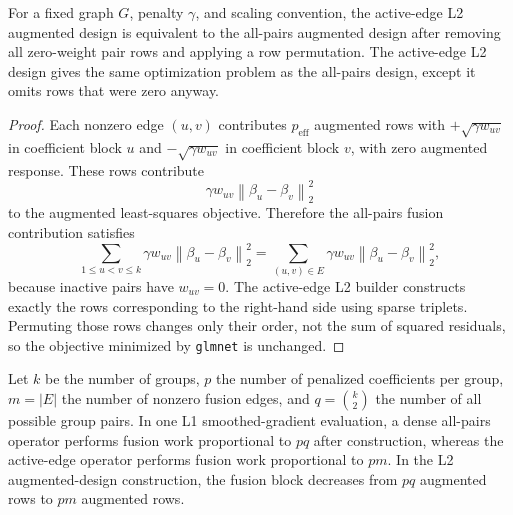 \documentclass[twoside,11pt]{article}
\newcommand{\norm}[1]{\left\lVert #1 \right\rVert}
\begin{document}
\begin{proposition}
\label{prop:l2-equivalence}
For a fixed graph $G$, penalty $\gamma$, and scaling convention, the active-edge L2 augmented design is equivalent to the all-pairs augmented design after removing all zero-weight pair rows and applying a row permutation.
The active-edge L2 design gives the same optimization problem as the all-pairs design, except it omits rows that were zero anyway.
\end{proposition}

\begin{proof}
Each nonzero edge $(u,v)$ contributes $p_{\mathrm{eff}}$ augmented rows with $+\sqrt{\gamma w_{uv}}$ in coefficient block $u$ and $-\sqrt{\gamma w_{uv}}$ in coefficient block $v$, with zero augmented response. 
These rows contribute
\[
  \gamma w_{uv}\norm{\beta_u-\beta_v}_2^2
\]
to the augmented least-squares objective. 
Therefore the all-pairs fusion contribution satisfies
\[
  \sum_{1\leq u<v\leq k}
  \gamma w_{uv}\norm{\beta_u-\beta_v}_2^2
  =
  \sum_{(u,v)\in E}
  \gamma w_{uv}\norm{\beta_u-\beta_v}_2^2,
\]
because inactive pairs have $w_{uv}=0$. 
The active-edge L2 builder constructs exactly the rows corresponding to the right-hand side using sparse triplets.
Permuting those rows changes only their order, not the sum of squared residuals, so the objective minimized by \texttt{glmnet} is unchanged.
\end{proof}

\begin{proposition}
\label{prop:complexity}
\leavevmode\par\noindent
Let $k$ be the number of groups, $p$ the number of penalized coefficients per group, $m=|E|$ the number of nonzero fusion edges, and $q=\binom{k}{2}$ the number of all possible group pairs. 
In one L1 smoothed-gradient evaluation, a dense all-pairs operator performs fusion work proportional to $pq$ after construction, whereas the active-edge operator performs fusion work proportional to $pm$. 
In the L2 augmented-design construction, the fusion block decreases from $pq$ augmented rows to $pm$
augmented rows.
\end{proposition}
\end{document}
